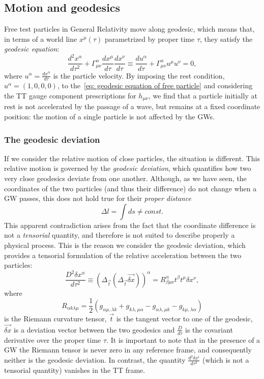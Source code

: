 \subsection{Motion and geodesics}
Free test particles in General Relativity move along geodesic, which means that, in terms of a world line $x^\mu(\tau)$ parametrized by proper time $\tau$, they satisfy the \textit{geodesic equation}:
\begin{equation}
    \frac{d^2x^\alpha}{d\tau^2} + \Gamma^\alpha_{\mu\nu} \frac{dx^\mu}{d\tau}\frac{dx^\nu}{d\tau} \equiv \frac{du^\alpha}{d\tau} + \Gamma^\alpha_{\mu\nu}u^\mu u^\nu = 0,
    \label{eq: geodesic equation of free particle}
\end{equation}
where $u^\alpha = \frac{dx^\alpha}{d\tau}$ is the particle velocity.
By imposing the rest condition, $u^\alpha = (1,0,0,0)$, to the~\eqref{eq: geodesic equation of free particle} and considering the TT gauge component prescriptions for $h_{\mu\nu}$, we find that a particle initially at rest is not accelerated by the passage of a wave, but remains at a fixed coordinate position: the motion of a single particle is not affected by the GWs.

\subsubsection{The geodesic deviation}
If we consider the relative motion of close particles, the situation is different.
This relative motion is governed by the \textit{geodesic deviation}, which quantifies how two very close geodesics deviate from one another.
Although, as we have seen, the coordinates of the two particles (and thus their difference) do not change when a GW passes, this does not hold true for their \textit{proper distance}
\[
    \Delta l = \int ds \not = const.
\]
This apparent contradiction arises from the fact that the coordinate difference is not a \textit{tensorial} quantity, and therefore is not suited to describe properly a physical process.
This is the reason we consider the geodesic deviation, which provides a tensorial formulation of the relative acceleration between the two particles: 
\begin{equation}
    \frac{D^2\delta x^\alpha}{d\tau^2} \equiv {(\Delta_{\vec{t}}(\Delta_{\vec{t}}\vec{\delta x}))}^\alpha = R^\alpha_{\beta\mu\nu}t^\beta t^\mu \delta x^\nu,
    \label{eq: geodesic deviation}
\end{equation}
where 
\begin{equation}
    R_{\alpha k \lambda \mu} = \frac{1}{2}( g_{\alpha\mu,\lambda k}  + g_{k\lambda,\mu \alpha }  - g_{\alpha\lambda,\mu k }  - g_{k\mu,\lambda \alpha })
    \label{eq: Riemann tensor def}
\end{equation}
is the Riemann curvature tensor, $\vec{t}$ is the tangent vector to one of the geodesic, $\vec{\delta x}$ is a deviation vector between the two geodesics and $\frac{D}{d\tau}$ is the covariant derivative over the proper time $\tau$.
It is important to note that in the presence of a GW the Riemann tensor is never zero in any reference frame, and consequently neither is the geodesic deviation. 
In contrast, the quantity $\frac{d^2\delta x^i}{d\tau^2}$ (which is not a tensorial quantity) vanishes in the TT frame.

